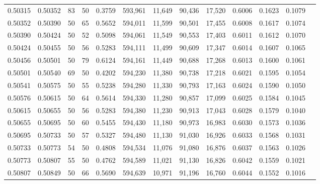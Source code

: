 \begin{tabular}{rrrrrrrrrrrrr}
0.50315 & 0.50352 &    83 &  50 &                                     0.3759 & 593,961 &  11,649 &  90,436 &  17,520 & 0.6006 & 0.1623 & 0.1079 \\
0.50352 & 0.50390 &    50 &  65 &                                     0.5652 & 594,011 &  11,599 &  90,501 &  17,455 & 0.6008 & 0.1617 & 0.1074 \\
0.50390 & 0.50424 &    50 &  52 &                                     0.5098 & 594,061 &  11,549 &  90,553 &  17,403 & 0.6011 & 0.1612 & 0.1070 \\
0.50424 & 0.50455 &    50 &  56 &                                     0.5283 & 594,111 &  11,499 &  90,609 &  17,347 & 0.6014 & 0.1607 & 0.1065 \\
0.50456 & 0.50501 &    50 &  79 &                                     0.6124 & 594,161 &  11,449 &  90,688 &  17,268 & 0.6013 & 0.1600 & 0.1061 \\
0.50501 & 0.50540 &    69 &  50 &                                     0.4202 & 594,230 &  11,380 &  90,738 &  17,218 & 0.6021 & 0.1595 & 0.1054 \\
0.50541 & 0.50575 &    50 &  55 &                                     0.5238 & 594,280 &  11,330 &  90,793 &  17,163 & 0.6024 & 0.1590 & 0.1050 \\
0.50576 & 0.50615 &    50 &  64 &                                     0.5614 & 594,330 &  11,280 &  90,857 &  17,099 & 0.6025 & 0.1584 & 0.1045 \\
0.50615 & 0.50655 &    50 &  56 &                                     0.5283 & 594,380 &  11,230 &  90,913 &  17,043 & 0.6028 & 0.1579 & 0.1040 \\
0.50655 & 0.50695 &    50 &  60 &                                     0.5455 & 594,430 &  11,180 &  90,973 &  16,983 & 0.6030 & 0.1573 & 0.1036 \\
0.50695 & 0.50733 &    50 &  57 &                                     0.5327 & 594,480 &  11,130 &  91,030 &  16,926 & 0.6033 & 0.1568 & 0.1031 \\
0.50733 & 0.50773 &    54 &  50 &                                     0.4808 & 594,534 &  11,076 &  91,080 &  16,876 & 0.6037 & 0.1563 & 0.1026 \\
0.50773 & 0.50807 &    55 &  50 &                                     0.4762 & 594,589 &  11,021 &  91,130 &  16,826 & 0.6042 & 0.1559 & 0.1021 \\
0.50807 & 0.50849 &    50 &  66 &                                     0.5690 & 594,639 &  10,971 &  91,196 &  16,760 & 0.6044 & 0.1552 & 0.1016 \\

\end{tabular}
